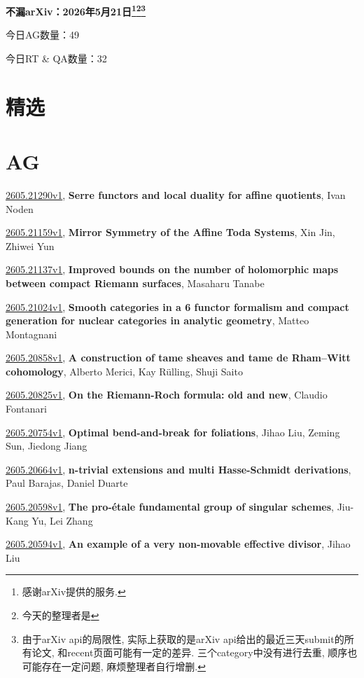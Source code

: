 \documentclass[9pt, a4paper]{article}
\theoremstyle{plain}
\theoremstyle{definition}
\theoremstyle{remark}
\newcommand{\arxiv}[3]{\href{https://arxiv.org/abs/#1}{#1}, \textbf{\textcolor{arxivblue}{#2}}, #3}
\newcommand{\AGnumber}{49}
\newcommand{\RTQAnumber}{32}
\newcommand{\NewestDate}{2026年5月21日}
\newcommand{\todayarXiver}{} %
\begin{document}
\begin{center}
    \Huge\textbf{不漏arXiv：\NewestDate\footnote{感谢arXiv提供的服务.}\footnote{今天的整理者是\todayarXiver}\footnote{由于arXiv api的局限性, 实际上获取的是arXiv api给出的最近三天submit的所有论文, 和recent页面可能有一定的差异. 三个category中没有进行去重, 顺序也可能存在一定问题, 麻烦整理者自行增删.}} \\
\end{center}

\setcounter{section}{-1}

\begin{center}
    今日AG数量：\AGnumber
    
    今日RT \& QA数量：\RTQAnumber
    
\end{center}


\section{精选}


\section{AG}
\arxiv{2605.21290v1}{Serre functors and local duality for affine quotients}{Ivan Noden}

\arxiv{2605.21159v1}{Mirror Symmetry of the Affine Toda Systems}{Xin Jin, Zhiwei Yun}

\arxiv{2605.21137v1}{Improved bounds on the number of holomorphic maps between compact Riemann surfaces}{Masaharu Tanabe}

\arxiv{2605.21024v1}{Smooth categories in a 6 functor formalism and compact generation for nuclear categories in analytic geometry}{Matteo Montagnani}

\arxiv{2605.20858v1}{A construction of tame sheaves and tame de Rham--Witt cohomology}{Alberto Merici, Kay Rülling, Shuji Saito}

\arxiv{2605.20825v1}{On the Riemann-Roch formula: old and new}{Claudio Fontanari}

\arxiv{2605.20754v1}{Optimal bend-and-break for foliations}{Jihao Liu, Zeming Sun, Jiedong Jiang}

\arxiv{2605.20664v1}{n-trivial extensions and multi Hasse-Schmidt derivations}{Paul Barajas, Daniel Duarte}

\arxiv{2605.20598v1}{The pro-étale fundamental group of singular schemes}{Jiu-Kang Yu, Lei Zhang}

\arxiv{2605.20594v1}{An example of a very non-movable effective divisor}{Jihao Liu}
\end{document}
